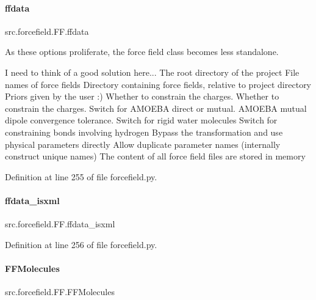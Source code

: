 \paragraph{\texorpdfstring{ffdata}{ffdata}}
{\footnotesize\ttfamily src.\+forcefield.\+F\+F.\+ffdata}



As these options proliferate, the force field class becomes less standalone. 

I need to think of a good solution here... The root directory of the project File names of force fields Directory containing force fields, relative to project directory Priors given by the user \+:) Whether to constrain the charges. Whether to constrain the charges. Switch for A\+M\+O\+E\+BA direct or mutual. A\+M\+O\+E\+BA mutual dipole convergence tolerance. Switch for rigid water molecules Switch for constraining bonds involving hydrogen Bypass the transformation and use physical parameters directly Allow duplicate parameter names (internally construct unique names) The content of all force field files are stored in memory 

Definition at line 255 of file forcefield.\+py.

\mbox{\label{classsrc_1_1forcefield_1_1FF_ace3214e3e4146833be44b9691a3fa90b}} 
\paragraph{\texorpdfstring{ffdata\+\_\+isxml}{ffdata\_isxml}}
{\footnotesize\ttfamily src.\+forcefield.\+F\+F.\+ffdata\+\_\+isxml}



Definition at line 256 of file forcefield.\+py.

\mbox{\label{classsrc_1_1forcefield_1_1FF_a301f03eb7fa12eaf1d3a0cdb4dc61030}} 
\paragraph{\texorpdfstring{F\+F\+Molecules}{FFMolecules}}
{\footnotesize\ttfamily src.\+forcefield.\+F\+F.\+F\+F\+Molecules}



